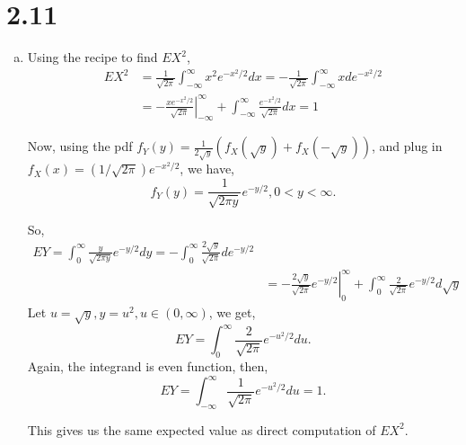 \documentclass[letterpaper]{article}
\newcommand{\intii}{\int_{-\infty}^\infty}
\newcommand{\intzi}{\int_0^\infty}
\begin{document}
    \section*{2.11}
    \begin{enumerate}[(a)]
    \item Using the recipe to find $EX^2$,
    \begin{align*}
    EX^2 & = \frac{1}{\sqrt{2\pi}} \intii x^2 e^{-x^2/2} dx
    = -\frac{1}{\sqrt{2\pi}} \intii x d e^{-x^2/2} \\
    & = \left.-\frac{x e^{-x^2/2}}{\sqrt{2\pi}}\right|^\infty_{-\infty} + \intii \frac{e^{-x^2/2}}{\sqrt{2\pi}} dx = 1
    \end{align*}

    Now, using the pdf 
    $f_Y(y) = \frac{1}{2\sqrt{y}}\left(f_X(\sqrt{y}) + f_X(-\sqrt{y})\right)$, and plug in $f_X(x) = (1/\sqrt{2\pi})e^{-x^2/2}$, we have,
    \[
    f_Y(y) = \frac{1}{\sqrt{2\pi y}}e^{-y/2}, 0 < y < \infty.
    \]

    So,
    \begin{align*}
    EY = \intzi \frac{y}{\sqrt{2\pi y}} e^{-y/2} dy = 
    - \intzi \frac{2\sqrt{y}}{\sqrt{2\pi}} d e^{-y/2} \\
    & = - \left. \frac{2\sqrt{y}}{\sqrt{2\pi}} e^{-y/2} \right|_0^\infty
    + \intzi \frac{2}{\sqrt{2\pi}} e^{-y/2} d\sqrt{y}
    \end{align*}
    Let $u = \sqrt{y}, y = u^2, u \in (0, \infty)$, we get,
    \[
    EY = \intzi \frac{2}{\sqrt{2\pi}} e^{-u^2/2} du.
    \]
    Again, the integrand is even function, then,
    \[
    EY = \intii \frac{1}{\sqrt{2\pi}} e^{-u^2/2} du = 1.
    \]

    This gives us the same expected value as direct computation of $EX^2$.


\end{enumerate}
\end{document}
